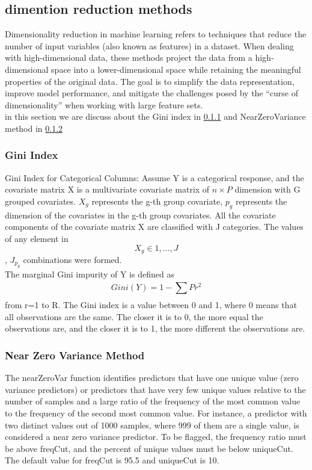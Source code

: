 \documentclass[preprint,12pt]{elsarticle}
\begin{document}
\subsection{dimention reduction methods}
\label{sec3_1}

Dimensionality reduction in machine learning refers to techniques that reduce the number of input variables (also known as features) in a dataset. When dealing with high-dimensional data, these methods project the data from a high-dimensional space into a lower-dimensional space while retaining the meaningful properties of the original data. The goal is to simplify the data representation, improve model performance, and mitigate the challenges posed by the “curse of dimensionality” when working with large feature sets.\\

in this section we are discuss about the Gini index in \ref{sec3_1_1} and NearZeroVariance method in \ref{sec3_1_2}

\subsubsection{Gini Index}
\label{sec3_1_1}

Gini Index for Categorical Columns: Assume Y is a categorical response, and the covariate matrix X is a multivariate covariate matrix of $n \times P$ dimension with G grouped covariates. $X_g$ represents the g-th group covariate, $p_g$ represents the dimension of the covariates in the g-th group covariates. All the covariate components of the covariate matrix X are classified with J categories. The values of any element in $$X_g \in {1, … ,J}$$, $J_p_g$ combinations were formed.\\
The marginal Gini impurity of Y is defined as $$Gini(Y) = 1 -  \sum_{}^{}Pr^2$$ from r=1 to R. The Gini index is a value between 0 and 1, where 0 means that all observations are the same. The closer it is to 0, the more equal the observations are, and the closer it is to 1, the more different the observations are.

\subsubsection{Near Zero Variance Method}
\label{sec3_1_2}
The nearZeroVar function identifies predictors that have one unique value (zero variance predictors) or predictors that have very few unique values relative to the number of samples and a large ratio of the frequency of the most common value to the frequency of the second most common value. For instance, a predictor with two distinct values out of 1000 samples, where 999 of them are a single value, is considered a near zero variance predictor. To be flagged, the frequency ratio must be above freqCut, and the percent of unique values must be below uniqueCut. The default value for freqCut is 95.5 and uniqueCut is 10.
\end{document}
